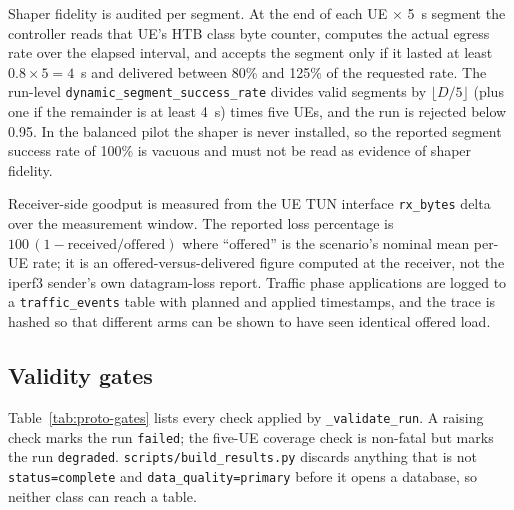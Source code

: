 Shaper fidelity is audited per segment. At the end of each UE $\times$ 5~s segment the
controller reads that UE's HTB class byte counter, computes the actual egress rate over the
elapsed interval, and accepts the segment only if it lasted at least $0.8\times5=4$~s and
delivered between 80\% and 125\% of the requested rate. The run-level
\texttt{dynamic\_segment\_success\_rate} divides valid segments by
$\lfloor D/5\rfloor$ (plus one if the remainder is at least 4~s) times five UEs, and the run is
rejected below 0.95. In the balanced pilot the shaper is never installed, so the reported
segment success rate of 100\% is vacuous and must not be read as evidence of shaper fidelity.

Receiver-side goodput is measured from the UE TUN interface \texttt{rx\_bytes} delta over the
measurement window. The reported loss percentage is
$100\,(1-\text{received}/\text{offered})$ where ``offered'' is the scenario's nominal mean
per-UE rate; it is an offered-versus-delivered figure computed at the receiver, not the
iperf3 sender's own datagram-loss report. Traffic phase applications are logged to a
\texttt{traffic\_events} table with planned and applied timestamps, and the trace is hashed so
that different arms can be shown to have seen identical offered load.

\subsection{Validity gates}
Table~\ref{tab:proto-gates} lists every check applied by \texttt{\_validate\_run}. A raising
check marks the run \texttt{failed}; the five-UE coverage check is non-fatal but marks the run
\texttt{degraded}. \texttt{scripts/build\_results.py} discards anything that is not
\texttt{status=complete} and \texttt{data\_quality=primary} before it opens a database, so
neither class can reach a table.


